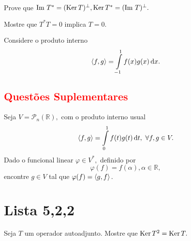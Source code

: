 \documentclass[11pt,a4paper]{article}
\begin{document}
\begin{exercicio} Prove que $\mbox{Im }T^{*} = (\operatorname{Ker} T)^{\perp}, \operatorname{Ker} T^{*} = (\mbox{Im }T)^{\perp}.$
\end{exercicio}


\begin{exercicio} Mostre que $T^*T = 0$ implica $T = 0.$

\end{exercicio}

\begin{exercicio} Considere o produto interno
\[
\prin{f,g} = \displaystyle\int\limits_{-1}^1 f(x) g(x) \dif x.
\]
\end{exercicio}
\solucao{}

\subsection*{\textcolor{red}{Questões Suplementares}}

\begin{exercicio} Seja $V = \mathcal{P}_n(\mathbb{R}),$ com o produto interno usual
\[
\prin{f,g} = \displaystyle\int\limits_{0}^1 f(t) g(t) \dif t, \ \forall f,g \in V.
\]
Dado o funcional linear $\varphi \in V^{*},$ definido por
\[
\varphi(f) = f(\alpha), \alpha \in \mathbb{R},
\]
encontre $g \in V$ tal que $\varphi(f) = \left\langle g,f \right\rangle.$
\end{exercicio}
\solucao{}

\section{\textcolor{Floresta}{Lista 5,2,2}}

\begin{exercicio}
 Seja $T$ um operador autoadjunto. Mostre que $\operatorname{Ker} T^2 = \operatorname{Ker} T.$
\end{exercicio} 
\end{document}
